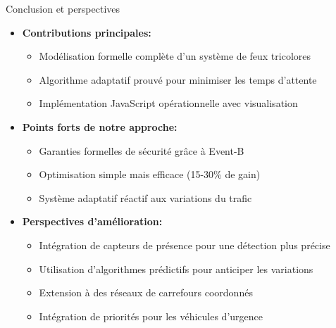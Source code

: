 \begin{frame}{Conclusion et perspectives}
  \begin{itemize}
    \item<1-> \textbf{Contributions principales:}
    \begin{itemize}
      \item Modélisation formelle complète d'un système de feux tricolores
      \item Algorithme adaptatif prouvé pour minimiser les temps d'attente
      \item Implémentation JavaScript opérationnelle avec visualisation
    \end{itemize}
    
    \item<2-> \textbf{Points forts de notre approche:}
    \begin{itemize}
      \item Garanties formelles de sécurité grâce à Event-B
      \item Optimisation simple mais efficace (15-30\% de gain)
      \item Système adaptatif réactif aux variations du trafic
    \end{itemize}
    
    \item<3-> \textbf{Perspectives d'amélioration:}
    \begin{itemize}
      \item Intégration de capteurs de présence pour une détection plus précise
      \item Utilisation d'algorithmes prédictifs pour anticiper les variations
      \item Extension à des réseaux de carrefours coordonnés
      \item Intégration de priorités pour les véhicules d'urgence
    \end{itemize}
  \end{itemize}
\end{frame}

